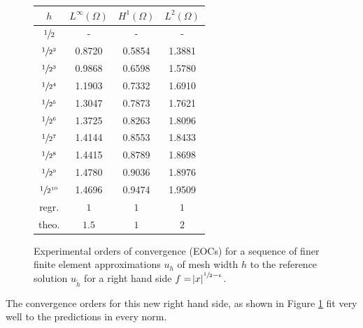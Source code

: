 \documentclass[headsepline,footsepline,footinclude=false,oneside,fontsize=11pt,paper=a4,listof=totoc,bibliography=totoc]{scrbook} %
\begin{document}
\begin{figure}
	\centering
	\bgroup
	\def\arraystretch{1.3}
	\begin{tabular}{cccc}
		\hline
		$h$ & $L^\infty(\Omega)$ & $H^1(\Omega)$ & $L^2(\Omega)$ \\
		\hline
		$\sfrac{1}{2}$      &	-		&		-		&		- \\
		$\sfrac{1}{2^2}$	&	\num{0.8720}		&		\num{0.5854}		&		\num{1.3881} \\
		$\sfrac{1}{2^3}$	&	\num{0.9868}		&		\num{0.6598}		&		\num{1.5780} \\
		$\sfrac{1}{2^4}$	&	\num{1.1903}		&		\num{0.7332}		&		\num{1.6910} \\
		$\sfrac{1}{2^5}$	&	\num{1.3047}		&		\num{0.7873}		&		\num{1.7621} \\
		$\sfrac{1}{2^6}$	&	\num{1.3725}		&		\num{0.8263}		&		\num{1.8096} \\
		$\sfrac{1}{2^7}$	&	\num{1.4144}		&		\num{0.8553}		&		\num{1.8433} \\
		$\sfrac{1}{2^8}$	&	\num{1.4415}		&		\num{0.8789}		&		\num{1.8698} \\
		$\sfrac{1}{2^9}$	&	\num{1.4780}		&		\num{0.9036}		&		\num{1.8976} \\
		$\sfrac{1}{2^{10}}$	&	\num{1.4696}		&		\num{0.9474}		&		\num{1.9509} \\
		\hline
		regr. & $1$ & $1$ & $1$ \\
		\hline										
		theo. & $1.5$ & $1$ & $2$
	\end{tabular}
	\egroup
	\caption[EOCs for  $f = \abs{x}^{\sfrac{1}{2} - \epsilon}$]{Experimental orders of convergence (EOCs) for a sequence of finer finite element approximations $u_h$ of mesh width $h$ to the reference solution $u_{\tilde{h}}$ for a right hand side $f = \abs{x}^{\sfrac{1}{2} - \epsilon}$.}
	\label{fig:eocs_L2}
\end{figure}

The convergence orders for this new right hand side, as shown in Figure \ref{fig:eocs_L2} fit very well to the predictions in every norm.

\listoffigures{}


\printbibliography{}
\end{document}
